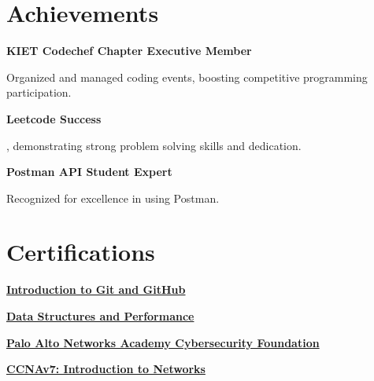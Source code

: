 \documentclass[letterpaper,10pt]{article}
\newcommand{\heading}[2]{
  \hspace{10pt}#1\hfill#2\\
}
\newcommand{\headingBf}[2]{
  \heading{\textbf{#1}}{\textbf{#2}}
}
\newenvironment{resume_list}{
  \vspace{-7pt}
  \begin{itemize}[itemsep=-2px, parsep=1pt, leftmargin=30pt]
}{
  \end{itemize}
}
\begin{document}
\section{Achievements}
\headingBf{KIET Codechef Chapter Executive Member}{}
\begin{resume_list}
  \item Organized and managed coding events, boosting competitive programming participation.
\end{resume_list}

\headingBf{Leetcode Success \href{https://www.leetcode.com/1md3nd}{\small\textit{\color{gray}{Link}}}}{}
\begin{resume_list}
  \item \textbf{\color{accentTitle}{Solved over 600 algorithm problems}}, demonstrating strong problem solving skills and dedication.
\end{resume_list}

\headingBf{Postman API Student Expert}{}
\begin{resume_list}
  \item Recognized for excellence in \textbf{\color{accentTitle}{API design, testing, and automation}} using Postman.
\end{resume_list}

\section{Certifications}
\begin{resume_list}  
  \item \headingBf{\href{https://www.coursera.org/account/accomplishments/verify/VAXY9EEWXD3C}{Introduction to Git and GitHub}}{}
  \item \headingBf{\href{https://www.coursera.org/account/accomplishments/verify/MEHYBBVAYE8E}{Data Structures and Performance}}{}
  \item \headingBf{\href{https://www.coursera.org/account/accomplishments/verify/R73VUS4L44RN}{Palo Alto Networks Academy Cybersecurity Foundation}}{}
  \item \headingBf{\href{https://drive.google.com/file/d/15n4G1_3d75gbxfikhzodotRZVXInxqhJ/view?usp=sharing}{CCNAv7: Introduction to Networks}}{}
\end{resume_list}
\end{document}

